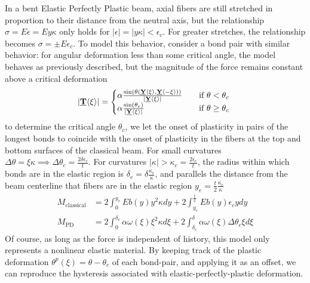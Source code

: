 \documentclass[11pt]{amsart}
\newcommand\vstate[3]{%
	\mathbf{\underline{#1}}%
	\ifstrempty{#2}{}{[#2]}%
	\ifstrempty{#3}{}{\langle #3 \rangle}}
\begin{document}
In a bent Elastic Perfectly Plastic beam, axial fibers are still stretched in proportion to their distance from the neutral axis, but the relationship \(\sigma = E\epsilon = Ey\kappa\) only holds for \(|\epsilon| = |y\kappa| < \epsilon_c\). 
For greater stretches, the relationship becomes \(\sigma = \pm E\epsilon_c \). 
To model this behavior, consider a bond pair with similar behavior: for angular deformation less than some critical angle, the model behaves as previously described, but the magnitude of the force remains constant above a critical deformation
%
\[ 
|\vstate{T}{}{\xi}| = 
  \begin{cases}
    \alpha \frac{\sin(\theta(\vstate{Y}{}{\xi},\vstate{Y}{}{\mathbf{-\xi}}))}{|\vstate{Y}{}{\xi}|} & \quad \text{if } \theta < \theta_c\\
    \alpha \frac{\sin(\theta_c)}{|\vstate{Y}{}{\xi}|} & \quad \text{if } \theta \geq \theta_c\
  \end{cases}
\]
%
to determine the critical angle \(\theta_c\), we let the onset of plasticity in pairs of the longest bonds to coincide with the onset of plasticity in the fibers at the top and bottom surfaces of the classical beam. 
For small curvatures \(\Delta\theta = \xi\kappa\implies\Delta\theta_c = \frac{2\delta\epsilon_c}{t}\). 
For curvatures \(|\kappa| > \kappa_c=\frac{2\epsilon_c}{t}\), the radius within which bonds are in the elastic region is \(\delta_e = \delta \frac{\kappa_c}{\kappa}\), and parallels the distance from the beam centerline that fibers are in the elastic region \(y_e = \frac{t}{2} \frac{\kappa_c}{\kappa}\)
%
\begin{align}
  M_\text{classical} &= 2 \int_{0}^{y_e}E b(y)y^2 \kappa dy +2 \int_{y_e}^{\frac{t}{2}}E b(y) \epsilon_c y dy \\
  M_\text{PD} &= 2 \int_{0}^{\delta_e}\alpha \omega(\xi) \xi^2 \kappa d\xi +2 \int_{\delta_e}^{\delta}\alpha \omega(\xi) \Delta\theta_c \xi d\xi 
\end{align}
%
Of course, as long as the force is independent of history, this model only represents a nonlinear elastic material. 
By keeping track of the plastic deformation \(\theta^p (\xi) = \theta-\theta_c\) of each bond-pair, and applying it as an offset, we can reproduce the hysteresis associated with elastic-perfectly-plastic deformation.
%
%
\end{document}

